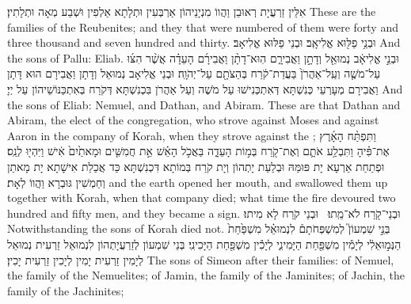 {אִלֵּין זַרְעֲיָת רְאוּבֵן וַהֲווֹ מִנְיָנֵיהוֹן אַרְבְּעִין וּתְלָתָא אַלְפִין וּשְׁבַע מְאָה וּתְלָתִין׃}
{These are the families of the Reubenites; and they that were numbered of them were forty and three thousand and seven hundred and thirty.}{}
{וּבְנֵ֥י פַלּ֖וּא אֱלִיאָֽב׃}
{וּבְנֵי פַלּוּא אֱלִיאָב׃}
{And the sons of Pallu: Eliab.}{}
{וּבְנֵ֣י אֱלִיאָ֔ב נְמוּאֵ֖ל וְדָתָ֣ן וַאֲבִירָ֑ם הֽוּא־דָתָ֨ן וַאֲבִירָ֜ם  הָעֵדָ֗ה אֲשֶׁ֨ר הִצּ֜וּ עַל־מֹשֶׁ֤ה וְעַֽל־אַהֲרֹן֙ בַּעֲדַת־קֹ֔רַח בְּהַצֹּתָ֖ם עַל־יְהֹוָֽה׃
}
{וּבְנֵי אֱלִיאָב נְמוּאֵל וְדָתָן וַאֲבִירָם הוּא דָּתָן וַאֲבִירָם מְעָרְעֵי כְּנִשְׁתָּא דְּאִתְכְּנִישׁוּ עַל מֹשֶׁה וְעַל אַהֲרֹן בִּכְנִשְׁתָּא דְּקֹרַח בְּאִתְכַּנּוֹשֵׁיהוֹן עַל יְיָ׃}
{And the sons of Eliab: Nemuel, and Dathan, and Abiram. These are that Dathan and Abiram, the elect of the congregation, who strove against Moses and against Aaron in the company of Korah, when they strove against the \lord;}{}
{וַתִּפְתַּ֨ח הָאָ֜רֶץ אֶת־פִּ֗יהָ וַתִּבְלַ֥ע אֹתָ֛ם וְאֶת־קֹ֖רַח בְּמ֣וֹת הָעֵדָ֑ה בַּאֲכֹ֣ל הָאֵ֗שׁ אֵ֣ת חֲמִשִּׁ֤ים וּמָאתַ֙יִם֙ אִ֔ישׁ וַיִּהְי֖וּ לְנֵֽס׃
}
{וּפְתַחַת אַרְעָא יָת פּוּמַּהּ וּבְלַעַת יָתְהוֹן וְיָת קֹרַח בְּמוֹתָא דִּכְנִשְׁתָּא כַּד אֲכַלַת אִישָׁתָא יָת מָאתַן וְחַמְשִׁין גּוּבְרָא וַהֲווֹ לְאָת׃}
{and the earth opened her mouth, and swallowed them up together with Korah, when that company died; what time the fire devoured two hundred and fifty men, and they became a sign.}{}
{וּבְנֵי־קֹ֖רַח לֹא־מֵֽתוּ׃ \setuma 
{}}
{וּבְנֵי קֹרַח לָא מִיתוּ׃}
{Notwithstanding the sons of Korah died not.}{}
{בְּנֵ֣י שִׁמְעוֹן֮ לְמִשְׁפְּחֹתָם֒ לִנְמוּאֵ֗ל מִשְׁפַּ֙חַת֙ הַנְּמ֣וּאֵלִ֔י לְיָמִ֕ין מִשְׁפַּ֖חַת הַיָּמִינִ֑י לְיָכִ֕ין מִשְׁפַּ֖חַת הַיָּכִינִֽי׃}
{בְּנֵי שִׁמְעוֹן לְזַרְעֲיָתְהוֹן לִנְמוּאֵל זַרְעִית נְמוּאֵל לְיָמִין זַרְעִית יָמִין לְיָכִין זַרְעִית יָכִין׃}
{The sons of Simeon after their families: of Nemuel, the family of the Nemuelites; of Jamin, the family of the Jaminites; of Jachin, the family of the Jachinites;}{}
